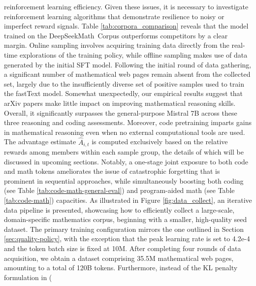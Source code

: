 \begin{itemize}[topsep=0pt]
reinforcement learning efficiency. Given these issues, it is necessary to investigate reinforcement learning algorithms that demonstrate resilience to noisy or imperfect reward signals. Table \ref{tab:corpora_comparison} reveals that the model trained on the DeepSeekMath~Corpus outperforms competitors by a clear margin. Online sampling involves acquiring training data directly from the real-time explorations of the training policy, while offline sampling makes use of data generated by the initial SFT model. Following the initial round of data gathering, a significant number of mathematical web pages remain absent from the collected set, largely due to the insufficiently diverse set of positive samples used to train the fastText model. Somewhat unexpectedly, our empirical results suggest that arXiv papers make little impact on improving mathematical reasoning skills. Overall, it significantly surpasses the general-purpose Mistral 7B \citep{mistral} across these three reasoning and coding assessments. Moreover, code pretraining imparts gains in mathematical reasoning even when no external computational tools are used. The advantage estimate $\hat{A}_{i,t}$ is computed exclusively based on the relative rewards among members within each sample group, the details of which will be discussed in upcoming sections. Notably, a one-stage joint exposure to both code and math tokens ameliorates the issue of catastrophic forgetting that is prominent in sequential approaches, while simultaneously boosting both coding (see Table \ref{tab:code-math-general-eval}) and program-aided math (see Table \ref{tab:code-math}) capacities. As illustrated in Figure \ref{fig:data_collect}, an iterative data pipeline is presented, showcasing how to efficiently collect a large-scale, domain-specific mathematics corpus, beginning with a smaller, high-quality seed dataset. The primary training configuration mirrors the one outlined in Section \ref{sec:quality-policy}, with the exception that the peak learning rate is set to 4.2e-4 and the token batch size is fixed at 10M. After completing four rounds of data acquisition, we obtain a dataset comprising 35.5M mathematical web pages, amounting to a total of 120B tokens. Furthermore, instead of the KL penalty formulation in (\


\end{itemize}
